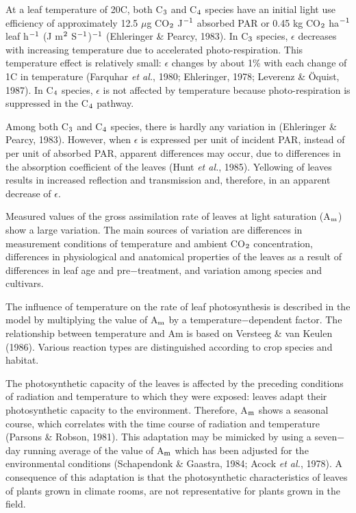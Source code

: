 At a leaf temperature of 20\degrees C, both C$_{{\rm 3}}$ and C$_{{\rm 4}}$ species have an initial 
light use efficiency of approximately 12.5 $\mu$g CO$_{{\rm 2}}$ J$^{{\rm -1}}$ absorbed PAR or 0.45 kg 
CO$_{{\rm 2}}$ ha$^{{\rm -}{1}}$ leaf h$^{{\rm -}{1}}$ (J m$^{{\rm 2}}$ S$^{{\rm -}{1}}$)$^{{\rm -}{1}}$
(Ehleringer \& Pearcy, 1983). In C$_{{\rm 3}}$ species, $\epsilon$ decreases with increasing temperature due
to accelerated photo-respiration. This temperature effect is relatively small: $\epsilon$ changes by
about 1\% with each change of 1\degrees C in temperature (Farquhar {\it et al.}, 1980; Ehleringer,
1978; Leverenz \& \"{O}quist, 1987). In C$_{{\rm 4}}$ species, $\epsilon$ is not affected by temperature because
photo-respiration is suppressed in the C$_{{\rm 4}}$ pathway. 

Among both C$_{{\rm 3}}$ and C$_{{\rm 4}}$ species, there
is hardly any variation in (Ehleringer \& Pearcy, 1983). However, when $\epsilon$ is expressed per
unit of incident PAR, instead of per unit of absorbed PAR, apparent differences may
occur, due to differences in the absorption coefficient of the leaves (Hunt {\it et al.}, 1985).
Yellowing of leaves results in increased reflection and transmission and, therefore, in an
apparent decrease of $\epsilon$.  

Measured values of the gross assimilation rate of leaves at light saturation (A$_{{\rm m}}$) show a
large variation. The main sources of variation are differences in measurement conditions
of temperature and ambient CO$_{{\rm 2}}$ concentration, differences in physiological and 
anatomical properties of the leaves as a result of differences in leaf age and pre$-$treatment, and
variation among species and cultivars.

The influence of temperature on the rate of leaf photosynthesis is described in the model
by multiplying the value of A$_{{\rm m}}$ by a temperature$-$dependent factor. The relationship
between temperature and Am is based on Versteeg \& van Keulen (1986). Various
reaction types are distinguished according to crop species and habitat.

The photosynthetic capacity of the leaves is affected by the preceding conditions of
radiation and temperature to which they were exposed: leaves adapt their photosynthetic
capacity to the environment. Therefore, A$_{{\rm m}}$ shows a seasonal course, which correlates
with the time course of radiation and temperature (Parsons \& Robson, 1981). This
adaptation may be mimicked by using a seven$-$day running average of the value of A$_{{\rm m}}$
which has been adjusted for the environmental conditions (Schapendonk \& Gaastra, 1984;
Acock {\it et al.}, 1978). A consequence of this adaptation is that the photosynthetic 
characteristics of leaves of plants grown in climate rooms, are not representative for plants grown
in the field.

